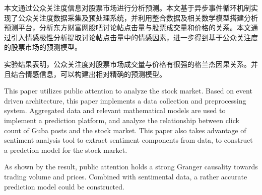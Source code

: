 \begin{cabstract}
  本文通过公众关注度信息对股票市场进行分析预测。本文基于异步事件循环机制实现了公众关注度数据采集及预处理系统，并利用整合数据及相关数学模型搭建分析预测平台，分析东方财富网股吧讨论帖点击量与股票成交量和价格的关系。本文通过引入情感极性分析提取讨论帖点击量中的情感因素，进一步得到基于公众关注度的股票市场的预测模型。

  实验结果表明，公众关注度对股票市场成交量与价格有很强的格兰杰因果关系。并且结合情感信息，可以构建出相对精确的预测模型。
\end{cabstract}


\begin{eabstract}
  This paper utilizes public attention to analyze the stock market. Based on event driven architecture, this paper implements a data collection and preprocessing system. Aggregated data and relevant mathematical models are used to implement a prediction platform, and analyze the relationship between click count of Guba posts and the stock market. This paper also takes advantage of sentiment analysis tool to extract sentiment components from data, to construct a predction model for the stock market.

  As shown by the result, public attention holds a strong Granger causality towards trading volume and prices. Combined with sentimental data, a rather accurate prediction model could be constructed.
\end{eabstract}

